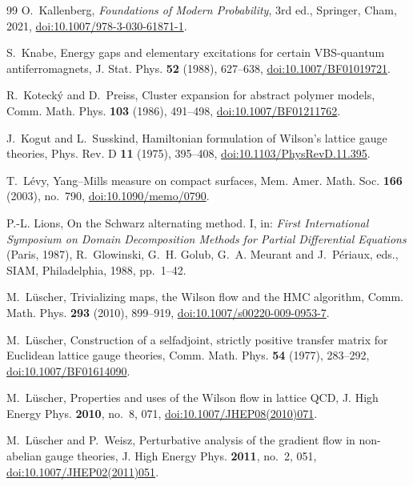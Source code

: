 \documentclass[aps,prd,twocolumn,superscriptaddress,nofootinbib,longbibliography,floatfix,amsmath,amssymb,10pt]{revtex4-2}
\theoremstyle{definition}
\theoremstyle{remark}
\begin{document}
\begin{thebibliography}{99}
O.~Kallenberg, \emph{Foundations of Modern Probability}, 3rd ed., Springer,
Cham, 2021, \href{https://doi.org/10.1007/978-3-030-61871-1}
{doi:10.1007/978-3-030-61871-1}.

S.~Knabe, Energy gaps and elementary excitations for certain VBS-quantum antiferromagnets, J. Stat. Phys. \textbf{52} (1988), 627--638, \href{https://doi.org/10.1007/BF01019721}{doi:10.1007/BF01019721}.

R.~Koteck\'y and D.~Preiss, Cluster expansion for abstract polymer models,
Comm. Math. Phys. \textbf{103} (1986), 491--498,
\href{https://doi.org/10.1007/BF01211762}{doi:10.1007/BF01211762}.

J.~Kogut and L.~Susskind, Hamiltonian formulation of Wilson's lattice gauge
theories, Phys. Rev. D \textbf{11} (1975), 395--408,
\href{https://doi.org/10.1103/PhysRevD.11.395}{doi:10.1103/PhysRevD.11.395}.

T.~L\'evy, Yang--Mills measure on compact surfaces, Mem. Amer. Math. Soc. \textbf{166} (2003), no.~790, \href{https://doi.org/10.1090/memo/0790}{doi:10.1090/memo/0790}.

P.-L. Lions, On the Schwarz alternating method. I, in: \emph{First
International Symposium on Domain Decomposition Methods for Partial
Differential Equations} (Paris, 1987), R.~Glowinski, G.~H. Golub,
G.~A. Meurant and J.~P\'eriaux, eds., SIAM, Philadelphia, 1988, pp.~1--42.

M.~L\"uscher, Trivializing maps, the Wilson flow and the HMC algorithm,
Comm. Math. Phys. \textbf{293} (2010), 899--919,
\href{https://doi.org/10.1007/s00220-009-0953-7}{doi:10.1007/s00220-009-0953-7}.

M.~L\"uscher, Construction of a selfadjoint, strictly positive transfer matrix
for Euclidean lattice gauge theories, Comm. Math. Phys. \textbf{54} (1977),
283--292,
\href{https://doi.org/10.1007/BF01614090}{doi:10.1007/BF01614090}.

M.~L\"uscher, Properties and uses of the Wilson flow in lattice QCD, J. High
Energy Phys. \textbf{2010}, no.~8, 071,
\href{https://doi.org/10.1007/JHEP08(2010)071}{doi:10.1007/JHEP08(2010)071}.

M.~L\"uscher and P.~Weisz, Perturbative analysis of the gradient flow in
non-abelian gauge theories, J. High Energy Phys. \textbf{2011}, no.~2, 051,
\href{https://doi.org/10.1007/JHEP02(2011)051}{doi:10.1007/JHEP02(2011)051}.


\end{thebibliography}
\end{document}
